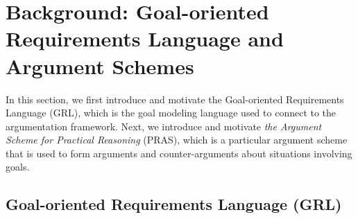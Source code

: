 \section{Background: Goal-oriented Requirements Language and Argument Schemes}
\label{sect:background}

In this section, we first introduce and motivate the Goal-oriented Requirements Language (GRL), which is the goal modeling language used to connect to the argumentation framework. Next, we introduce and motivate \emph{the Argument Scheme for Practical Reasoning} (PRAS), which is a particular argument scheme that is used to form arguments and counter-arguments about situations involving goals.

\subsection{Goal-oriented Requirements Language (GRL)}
\label{sect:background:grl}
